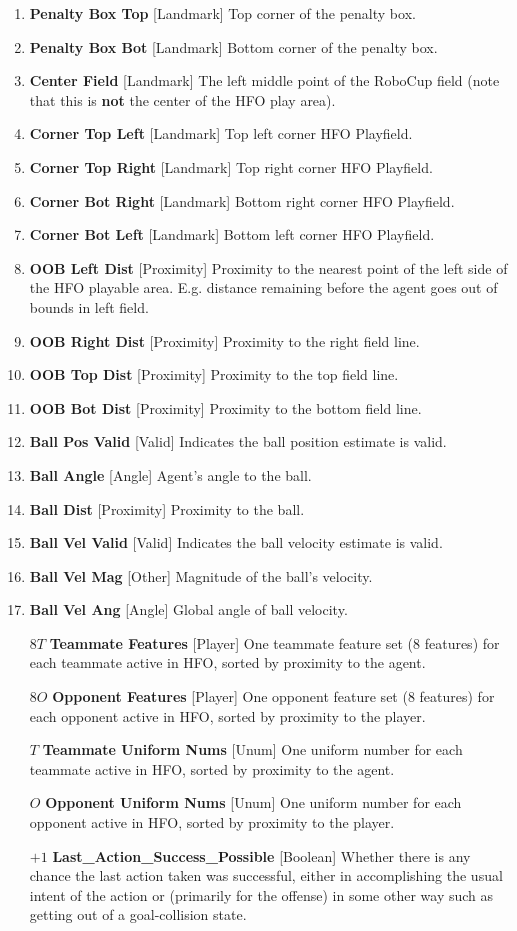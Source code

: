 \documentclass[12pt]{article}
\def\itemrange#1{%
\addtocounter{enumi}{1}%
\edef\labelenumi{\theenumi--\noexpand\theenumi}%
\addtocounter{enumi}{-1}%
\addtocounter{enumi}{#1}%
\item
\def\labelenumi{\theenumi}}
\renewcommand*{\labelenumi}{\theenumi}
\begin{document}
\begin{enumerate}[noitemsep]
  \itemrange{2}{\textbf{Penalty Box Top} [Landmark] Top corner of the penalty box.}
  \itemrange{2}{\textbf{Penalty Box Bot} [Landmark] Bottom corner of the penalty box.}
  \itemrange{2}{\textbf{Center Field} [Landmark] The left middle point of the RoboCup field
    (note that this is \textbf{not} the center of the HFO play area).}
  \itemrange{2}{\textbf{Corner Top Left} [Landmark] Top left corner HFO Playfield.}
  \itemrange{2}{\textbf{Corner Top Right} [Landmark] Top right corner HFO Playfield.}
  \itemrange{2}{\textbf{Corner Bot Right} [Landmark] Bottom right corner HFO Playfield.}
  \itemrange{2}{\textbf{Corner Bot Left} [Landmark] Bottom left corner HFO Playfield.}
  \item{\textbf{OOB Left Dist} [Proximity] Proximity to the nearest
    point of the left side of the HFO playable area. E.g. distance
    remaining before the agent goes out of bounds in left field.}
  \item{\textbf{OOB Right Dist} [Proximity] Proximity to the right
    field line.}
  \item{\textbf{OOB Top Dist} [Proximity] Proximity to the top field line.}
  \item{\textbf{OOB Bot Dist} [Proximity] Proximity to the bottom field line.}
  \item{\textbf{Ball Pos Valid} [Valid] Indicates the ball position estimate is valid.}
  \itemrange{1}{\textbf{Ball Angle} [Angle] Agent's angle to the ball.}
  \item{\textbf{Ball Dist} [Proximity] Proximity to the ball.}
  \item{\textbf{Ball Vel Valid} [Valid] Indicates the ball velocity estimate is valid.}
  \item{\textbf{Ball Vel Mag} [Other] Magnitude of the ball's velocity.}
  \itemrange{1}{\textbf{Ball Vel Ang} [Angle] Global angle of ball velocity.}
  \item [$8T$] {\textbf{Teammate Features} [Player] One teammate feature set (8 features)
	for each teammate active in HFO, sorted by proximity to the agent.}
  \item [$8O$] {\textbf{Opponent Features} [Player] One opponent feature set (8 features)
	for each opponent active in HFO, sorted by proximity to the player.}
  \item [$T$]  {\textbf{Teammate Uniform Nums} [Unum] One uniform number for each teammate active in HFO,
	sorted by proximity to the agent.}
  \item [$O$]  {\textbf{Opponent Uniform Nums} [Unum] One uniform number for each opponent active in HFO,
	sorted by proximity to the player.}
  \item [$+1$]  {\textbf{Last\_Action\_Success\_Possible} [Boolean] Whether there is any chance
		the last action taken was successful, either in accomplishing the
		usual intent of the action or (primarily for the offense) in some other way such as getting
		out of a goal-collision state.}
\end{enumerate}
\end{document}
